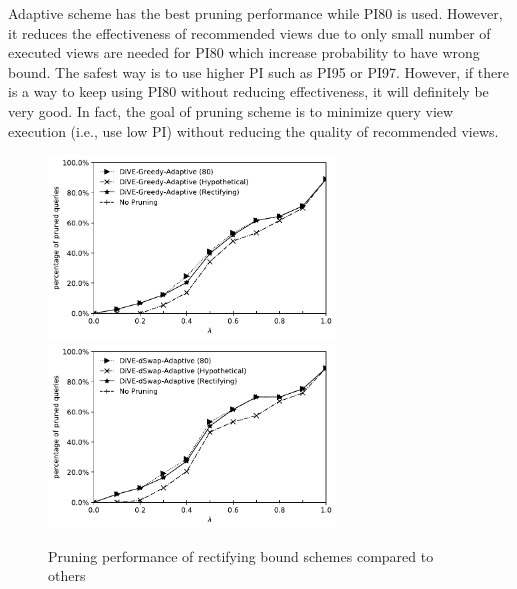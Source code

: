 \documentclass{article}
\begin{document}
Adaptive scheme has the best pruning performance while PI80 is used. However, it reduces the effectiveness of recommended views due to only small number of executed views are needed for PI80 which increase probability to have wrong bound. The safest way is to use higher PI such as PI95 or PI97. However, if there is a way to keep using PI80 without reducing effectiveness, it will definitely be very good. In fact, the goal of pruning scheme is to minimize query view execution (i.e., use low PI) without reducing the quality of recommended views. 
\begin{figure}
	\begin{center}
		\includegraphics[width=3.0in]{figures/pruning_performance_greedy_rectifying}
		\includegraphics[width=3.0in]{figures/pruning_performance_dswap_rectifying}
		\caption{Pruning performance of rectifying bound schemes compared to others}
		\label{fig:rectifying_bound_greedy_dswap}
	\end{center}
\end{figure}
\end{document}

